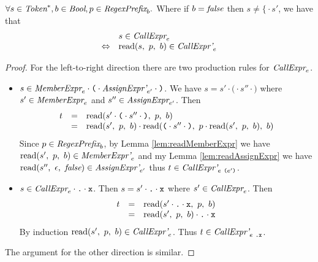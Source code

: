 \documentclass[preprint,10pt]{sigplanconf}
\begin{document}
\begin{lemma}\mbox{}
  
  \( \forall s \in \textit{Token}^*, b \in \textit{Bool}, p \in \textit{RegexPrefix}_b. \)
  Where if \( b = \textit{false} \) then \( s \not = \texttt{\{} \cdot s' \),
  we have that
  \[ 
  \begin{array}{rl}
  &s \in \textit{CallExpr}_{e} 
  \\
  \Leftrightarrow &
  \textrm{read}(s,~p,~b) \in \textit{CallExpr'}_{e} 
  \end{array}
  \]
\end{lemma}
\begin{proof}
  For the left-to-right direction there are two production rules for
  \( \textit{CallExpr}_{e} \).
  \begin{itemize}
  \item \( s \in
    \textit{MemberExpr}_{e} \cdot \texttt{(} \cdot \textit{AssignExpr'}_{e'} \cdot \texttt{)} \). We
    have \( s = s' \cdot 
    \texttt{(} \cdot s'' \cdot \texttt{)} \) where \( s' \in
    \textit{MemberExpr}_{e} \) and \( s'' \in \textit{AssignExpr}_{e'} \).
    Then
    \[
    \begin{array}{rcl}
      t &=& \textrm{read}(s' \cdot 
      \texttt{(} \cdot s'' \cdot \texttt{)}
      ,~p,~b)
      \\
      &=& \textrm{read}(s',~p,~b) \cdot
      \textrm{read}(
      \texttt{(} \cdot s'' \cdot \texttt{)}
      ,~
        p \cdot \textrm{read}(s',~p,~b)
      ,~b)
    \end{array}
    \]
    Since \( p \in \textit{RegexPrefix}_b \), by Lemma
    \ref{lem:readMemberExpr} we have \( \textrm{read}(s',~p,~b) \in
    \textit{MemberExpr'}_{e} \) and my Lemma
    \ref{lem:readAssignExpr} we have
    \(\textrm{read}(s'',~\epsilon,~\textit{false}) \in
    \textit{AssignExpr'}_{e'} \) thus \( t \in
    \textit{CallExpr'}_{e~\texttt{(} e' \texttt{)}} \).

  \item \( s \in \textit{CallExpr}_{e} \cdot \texttt{.} \cdot \texttt{x} \). Then \( s =
    s' \cdot \texttt{.}\cdot \texttt{x} \) where \( s' \in
    \textit{CallExpr}_{e} \). Then
    \[
    \begin{array}{rcl}
      t &=& \textrm{read}(s' \cdot \texttt{.} \cdot \texttt{x},~p,~b)
      \\
      &=& \textrm{read}(s',~p,~b) \cdot \texttt{.}\cdot \texttt{x}
    \end{array}
    \]
    By induction \( \textrm{read}(s',~p,~b) \in \textit{CallExpr'}_{e}
    \). Thus \( t \in \textit{CallExpr'}_{e~\texttt{.\texttt{x}}} \).
  \end{itemize}
  
  The argument for the other direction is similar.
\end{proof}
\end{document}
